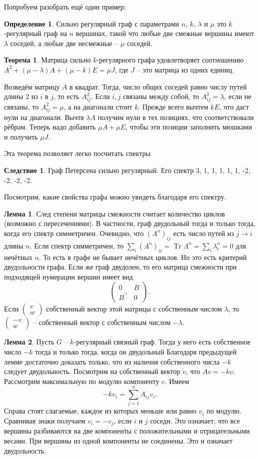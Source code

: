 \documentclass[10pt,a4paper,oneside]{book}
\theoremstyle{definition}
\newtheorem*{defn}{{\color{yellow!30!red} Определение}}
\newtheorem{thm}{{\color{red!40!black} Теорема}}
\newtheorem{lem}{{\color{green!50!black} Лемма}}
\newtheorem{cor}{Следствие}
\newcommand{\Tr}{\operatorname{Tr}}
\def\thrm{\begin{thm}}
\def\ethrm{\end{thm}}
\def\dfn{\begin{defn}}
\def\edfn{\end{defn}}
\def\lm{\begin{lem}}
\def\elm{\end{lem}}
\def\crl{\begin{cor}}
\def\ecrl{\end{cor}}
\def\pmat{\begin{pmatrix}}
\def\epmat{\end{pmatrix}}
\begin{document}
\noindent Попробуем разобрать ещё один пример:

\dfn Сильно регулярный граф с параметрами $n$, $k$, $\lambda$ и $\mu$ это $k$-регулярный граф на $n$ вершинах, такой что любые две смежные вершины имеют $\lambda$ соседей, а любые две несмежные -- $\mu$ соседей.
\edfn

\thrm Матрица сильно $k$-регулярного графа удовлетворяет соотношению $A^2+(\mu-\lambda)A + (\mu-k)E=\mu J$, где $J$ -- это матрица из одних единиц.
\ethrm
\proof Возведём матрицу $A$ в квадрат. Тогда, число общих соседей равно числу путей длины 2 из $i$ в $j$, то есть $A^2_{ij}$. Если $i,j$ связаны между собой, то $A^2_{ij}=\lambda$, если не связаны, то $A^2_{ij}=\mu$, а на диагонали стоит $k$. Прежде всего вычтем $kE$, что даст нули на диагонали. Вычтя $\lambda A$ получим нули в тех позициях, что соответствовали рёбрам. Теперь надо добавить $\mu A+ \mu E$, чтобы эти позиции заполнить мюшками и получить $\mu J$. 
\endproof

Эта теорема позволяет легко посчитать спектры 
\crl
 Граф Петерсена сильно регулярный. Его спектр 3, 1, 1, 1, 1, 1, -2, -2, -2, -2.
\ecrl



Посмотрим, какие свойства графа можно увидеть благодаря его спектру.

\lm  След степени матрицы смежности считает количество циклов (возможно с пересечениями). В частности, граф двудольный тогда и только тогда, когда его спектр симметричен. 
\proof Очевидно, что $(A^n)_{ij}$ есть число путей из $j\to i$ длины $n$. Если спектр симметричен, то $\sum_i (A^n)_{ii}= \Tr A^n = \sum_i \lambda_i^n =0$ для нечётных $n$. То есть в графе не бывает нечётных циклов. Но это есть критерий двудольности графа. Если же граф двудолен, то его матрица смежности при подходящей нумерации вершин имеет вид 
$$\pmat 0 & B \\ 
B^{\top} & 0 \epmat.$$
Если $\pmat v\\ w\epmat$ собственный вектор этой матрицы с собственным числом $\lambda$, то $\pmat -v\\ w\epmat$ -- собственный вектор с собственным числом $-\lambda$.
\endproof
\elm

\lm Пусть $G$ -- $k$-регулярный связный граф. Тогда у него есть собственное число $-k$ тогда и только тогда, когда он двудольный
\proof Благодаря предыдущей лемме достаточно доказать только, что из наличия собственного числа $-k$ следует двудольность. Посмотрим на собственный вектор $v$, что $Av=-kv$. Рассмотрим максимальную по модулю компоненту $v$. Имеем 
$$-kv_i=\sum_{j=1}^n A_{ij}v_i.$$
Справа стоят слагаемые, каждое из которых меньше или равно $v_i$ по модулю. Сравнивая знаки получаем $v_i=-v_j$, если $i$ и $j$ соседи. Это означает, что все вершины разбиваются на две компоненты с положительными и отрицательными весами. При вершины из одной компоненты не соединены. Это и означает двудольность. 
\endproof
\elm
\end{document}
